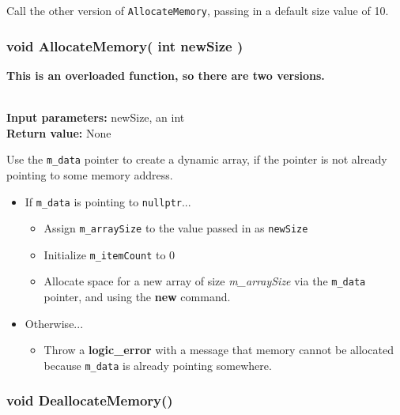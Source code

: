 \documentclass[a4paper,12pt]{book}
\begin{document}
    Call the other version of \texttt{AllocateMemory}, passing in a default
    size value of 10.
    
    \hrulefill
    \subsubsection*{void AllocateMemory( int newSize )}

    \textbf{This is an overloaded function, so there are two versions.}

    \begin{framed} ~\\
        \textbf{Input parameters:} newSize, an int \\
        \textbf{Return value:} None
    \end{framed}

    Use the \texttt{m\_data} pointer to create a dynamic array, if the
    pointer is not already pointing to some memory address.

    \begin{itemize}
        \item If \texttt{m\_data} is pointing to \texttt{nullptr}...
            \begin{itemize}
                \item Assign \texttt{m\_arraySize} to the value passed in as \texttt{newSize}
                \item Initialize \texttt{m\_itemCount} to 0
                \item Allocate space for a new array of size \textit{m\_arraySize} via the
                    \texttt{m\_data} pointer, and using the \textbf{new} command.            
            \end{itemize}
        \item Otherwise...
            \begin{itemize}
                \item Throw a \textbf{logic\_error} with a message that
                    memory cannot be allocated because \texttt{m\_data} is already pointing somewhere.
            \end{itemize}
    \end{itemize}
    
    \hrulefill
    \subsubsection*{void DeallocateMemory()}
\end{document}
